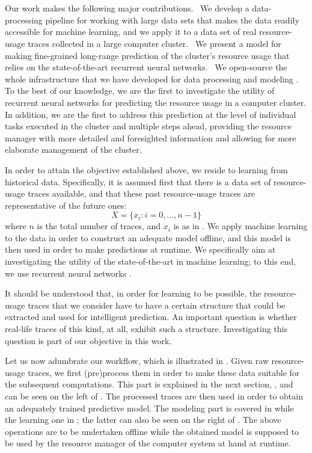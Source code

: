 \section{\solutiontitle}

Our work makes the following major contributions. \one~We develop a
data-processing pipeline for working with large data sets that makes the data
readily accessible for machine learning, and we apply it to a data set of real
resource-usage traces collected in a large computer cluster. \two~We present a
model for making fine-grained long-range prediction of the cluster's resource
usage that relies on the state-of-the-art recurrent neural networks. \three~We
open-source the whole infrastructure that we have developed for data processing
and modeling \cite{sources}. To the best of our knowledge, we are the first to
investigate the utility of recurrent neural networks for predicting the resource
usage in a computer cluster. In addition, we are the first to address this
prediction at the level of individual tasks executed in the cluster and multiple
steps ahead, providing the resource manager with more detailed and foresighted
information and allowing for more elaborate management of the cluster.

In order to attain the objective established above, we reside to learning from
historical data. Specifically, it is assumed first that there is a data set of
resource-usage traces available, and that these past resource-usage traces are
representative of the future ones:
\[
  X = \{ x_i: i = 0, \dots, n - 1 \}
\]
where $n$ is the total number of traces, and $x_i$ is as in . We
apply machine learning to the data in order to construct an adequate model
offline, and this model is then used in order to make predictions at runtime. We
specifically aim at investigating the utility of the state-of-the-art in machine
learning; to this end, we use recurrent neural networks \cite{goodfellow2016}.

It should be understood that, in order for learning to be possible, the
resource-usage traces that we consider have to have a certain structure that
could be extracted and used for intelligent prediction. An important question is
whether real-life traces of this kind, at all, exhibit such a structure.
Investigating this question is part of our objective in this work.

Let us now adumbrate our workflow, which is illustrated in .
Given raw resource-usage traces, we first (pre)process them in order to make
these data suitable for the subsequent computations. This part is explained in
the next section, , and can be seen on the left of .
The processed traces are then used in order to obtain an adequately trained
predictive model. The modeling part is covered in  while the
learning one in ; the latter can also be seen on the right of
. The above operations are to be undertaken offline while the
obtained model is supposed to be used by the resource manager of the computer
system at hand at runtime.

